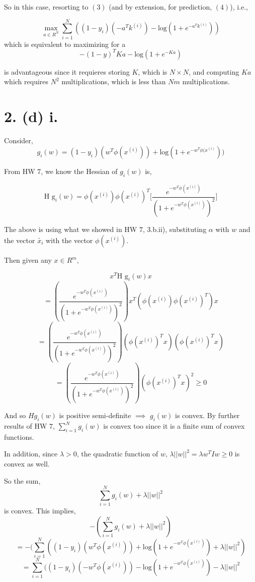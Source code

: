 \documentclass[]{article}
\begin{document}
So in this case, resorting to \((3)\) (and by extension, for prediction,
\((4)\)), i.e.,

\[\max_{a \in R^N} \displaystyle \sum_{i=1}^{N}((1-y_i)(-a^Tk^{(i)})-\text{log}(1+e^{-a^Tk^{(i)}}))\]
which is equivalent to maximizing for a
\[-(1-y)^TKa-\text{log}(1+e^{-Ka})\]

is advantageous since it requieres storing \(K\), which is
\(N \times N\), and computing \(Ka\) which requires \(N^2\)
multiplications, which is less than \(Nm\) multiplications.

\hypertarget{d-i.}{%
\section{2. (d) i.}\label{d-i.}}

Consider,
\[g_i(w)=(1-y_i)(w^T\phi(x^{(i)}))+\text{log}(1+e^{-w^T\phi(x^{(i)}}))\]

From HW \(7\), we know the Hessian of \(g_i(w)\) is,

\[\text{H g}_i(w)=\phi(x^{(i)})\phi(x^{(i)})^T\big[\frac{e^{-w^T\phi(x^{(i)})}}{(1+e^{-w^T\phi(x^{(i)})})^2}\big]\]

The above is using what we showed in HW \(7\), \(3\).b.ii), substituting
\(\alpha\) with \(w\) and the vector \(\tilde{x_i}\) with the vector
\(\phi(x^{(i)})\).

Then given any \(x \in R^m,\)

\[x^T\text{H g}_i(w)x\]
\[=(\frac{e^{-w^T\phi(x^{(i)})}}{(1+e^{-w^T\phi(x^{(i)})})^2})x^T(\phi(x^{(i)})\phi(x^{(i)})^T)x\]
\[=(\frac{e^{-w^T\phi(x^{(i)})}}{(1+e^{-w^T\phi(x^{(i)})})^2})(\phi(x^{(i)})^Tx)(\phi(x^{(i)})^Tx)\]
\[=(\frac{e^{-w^T\phi(x^{(i)})}}{(1+e^{-w^T\phi(x^{(i)})})^2})(\phi(x^{(i)})^Tx)^2 \geq 0\]

And so \(Hg_i(w)\) is positive semi-definite \(\implies\) \(g_i(w)\) is
convex. By further results of HW \(7\),
\(\displaystyle \sum_{i=1}^{N}g_i(w)\) is convex too since it is a
finite sum of convex functions.

In addition, since \(\lambda > 0\), the quadratic function of \(w\),
\(\lambda||w||^2=\lambda w^TIw \geq0\) is convex as well.

So the sum, \[\displaystyle \sum_{i=1}^{N}g_i(w)+\lambda||w||^2\] is
convex. This implies,
\[-(\displaystyle \sum_{i=1}^{N}g_i(w)+\lambda||w||^2)\]
\[=-(\displaystyle \sum_{i=1}^{N}((1-y_i)(w^T\phi(x^{(i)}))+\text{log}(1+e^{-w^T\phi(x^{(i)})})+\lambda||w||^2)\]
\[=\displaystyle \sum_{i=1}^{N}((1-y_i)(-w^T\phi(x^{(i)}))-\text{log}(1+e^{-w^T\phi(x^{(i)})})-\lambda||w||^2\]
\end{document}
